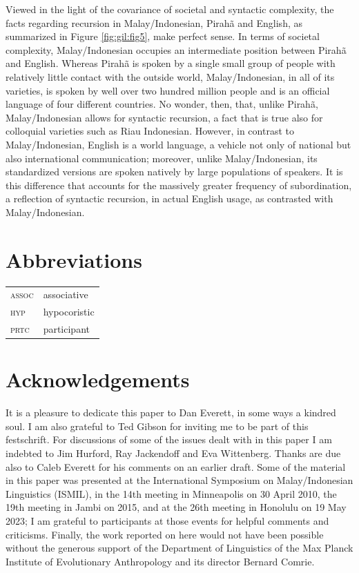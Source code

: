 \documentclass[output=paper,colorlinks,citecolor=brown
]{langscibook}
\begin{document}
Viewed in the light of the covariance of societal and syntactic complexity, the facts regarding recursion in Malay/Indonesian, Pirahã and English, as summarized in Figure \ref{fig:gil:fig5}, make perfect sense.  In terms of societal complexity, Malay/Indonesian occupies an intermediate position between Pirahã and English.  Whereas Pirahã is spoken by a single small group of people with relatively little contact with the outside world, Malay/Indonesian, in all of its varieties, is spoken by well over two hundred million people and is an official language of four different countries.  No wonder, then, that, unlike Pirahã, Malay/Indonesian allows for syntactic recursion, a fact that is true also for colloquial varieties such as Riau Indonesian.  However, in contrast to Malay/Indonesian, English is a world language, a vehicle not only of national but also international communication; moreover, unlike Malay/Indonesian, its standardized versions are spoken natively by large populations of speakers.  It is this difference that accounts for the massively greater frequency of subordination, a reflection of syntactic recursion, in actual English usage, as contrasted with Malay/Indonesian.

\section*{Abbreviations}
\begin{tabularx}{.5\textwidth}{@{}lQ@{}}
\textsc{assoc} & associative \\
\textsc{hyp} & hypocoristic \\
\textsc{prtc} & participant \\
\end{tabularx}

\section*{Acknowledgements}
It is a pleasure to dedicate this paper to Dan Everett, in some ways a kindred soul.  I am also grateful to Ted Gibson for inviting me to be part of this festschrift.  For discussions of some of the issues dealt with in this paper I am indebted to Jim Hurford, Ray Jackendoff and Eva Wittenberg.  Thanks are due also to Caleb Everett for his comments on an earlier draft.  Some of the material in this paper was presented at the International Symposium on Malay/Indonesian Linguistics (ISMIL), in the 14th meeting in Minneapolis on 30 April 2010, the 19th meeting in Jambi on 2015, and at the 26th meeting in Honolulu on 19 May 2023; I am grateful to participants at those events for helpful comments and criticisms.  Finally, the work reported on here would not have been possible without the generous support of the Department of Linguistics of the Max Planck Institute of Evolutionary Anthropology and its director Bernard Comrie.

\printbibliography[heading=subbibliography,notkeyword=this]
\end{document}
